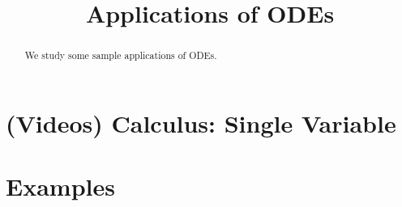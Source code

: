 \documentclass{ximera}
\title{Applications of ODEs}
\begin{document}
\begin{abstract}
We study some sample applications of ODEs.
\end{abstract}
\maketitle

\section*{(Videos) Calculus: Single Variable}

\section*{Examples}

\begin{example}

\end{example}

\begin{example}

\end{example}
\end{document}
